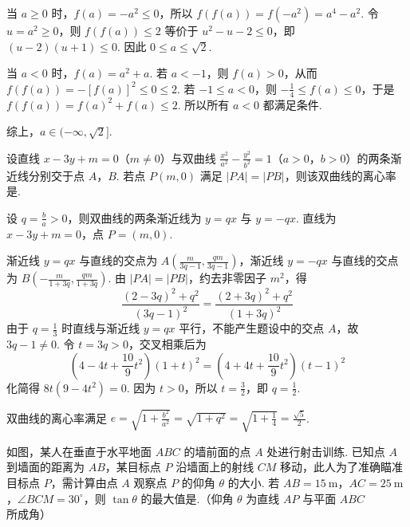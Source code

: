 \begin{solution}
当 \(a\geqslant0\) 时，\(f(a)=-a^2\leqslant0\)，所以 \(f(f(a))=f(-a^2)=a^4-a^2\). 令 \(u=a^2\geqslant0\)，则 \(f(f(a))\leqslant2\) 等价于 \(u^2-u-2\leqslant0\)，即 \((u-2)(u+1)\leqslant0\). 因此 \(0\leqslant a\leqslant\sqrt2\).

当 \(a<0\) 时，\(f(a)=a^2+a\). 若 \(a<-1\)，则 \(f(a)>0\)，从而 \(f(f(a))=-[f(a)]^2\leqslant0\leqslant2\). 若 \(-1\leqslant a<0\)，则 \(-\frac14\leqslant f(a)\leqslant0\)，于是 \(f(f(a))=f(a)^2+f(a)\leqslant2\). 所以所有 \(a<0\) 都满足条件.

综上，\(a\in(-\infty,\sqrt2]\).
\end{solution}

\begin{problem}
设直线 \(x - 3y + m = 0\)（\(m \neq 0\)）与双曲线 \(\frac{x^2}{a^2} - \frac{y^2}{b^2} = 1\)（\(a > 0\)，\(b > 0\)）的两条渐近线分别交于点 \(A\)，\(B\). 若点 \(P(m, 0)\) 满足 \(|PA| = |PB|\)，则该双曲线的离心率是\fillinblank{}.
\end{problem}

\begin{solution}
设 \(q=\frac ba>0\)，则双曲线的两条渐近线为 \(y=qx\) 与 \(y=-qx\). 直线为 \(x-3y+m=0\)，点 \(P=(m,0)\).

渐近线 \(y=qx\) 与直线的交点为 \(A\left(\frac{m}{3q-1},\frac{qm}{3q-1}\right)\)，渐近线 \(y=-qx\) 与直线的交点为 \(B\left(-\frac{m}{1+3q},\frac{qm}{1+3q}\right)\). 由 \(|PA|=|PB|\)，约去非零因子 \(m^2\)，得
\[
\frac{(2-3q)^2+q^2}{(3q-1)^2}=\frac{(2+3q)^2+q^2}{(1+3q)^2}
\]
由于 \(q=\frac13\) 时直线与渐近线 \(y=qx\) 平行，不能产生题设中的交点 \(A\)，故 \(3q-1\neq0\). 令 \(t=3q>0\)，交叉相乘后为
\[
\left(4-4t+\frac{10}{9}t^2\right)(1+t)^2=\left(4+4t+\frac{10}{9}t^2\right)(t-1)^2
\]
化简得 \(8t(9-4t^2)=0\). 因为 \(t>0\)，所以 \(t=\frac32\)，即 \(q=\frac12\).

双曲线的离心率满足 \(e=\sqrt{1+\frac{b^2}{a^2}}=\sqrt{1+q^2}=\sqrt{1+\frac14}=\frac{\sqrt5}{2}\).
\end{solution}

\begin{problem}
如图，某人在垂直于水平地面 \(ABC\) 的墙前面的点 \(A\) 处进行射击训练. 已知点 \(A\) 到墙面的距离为 \(AB\)，某目标点 \(P\) 沿墙面上的射线 \(CM\) 移动，此人为了准确瞄准目标点 \(P\)，需计算由点 \(A\) 观察点 \(P\) 的仰角 \(\theta\) 的大小. 若 \(AB = 15\ \mathrm{m}\)，\(AC = 25\ \mathrm{m}\)，\(\angle BCM = 30^\circ\)，则 \(\tan\theta\) 的最大值是\fillinblank{}.（仰角 \(\theta\) 为直线 \(AP\) 与平面 \(ABC\) 所成角）

\end{problem}

